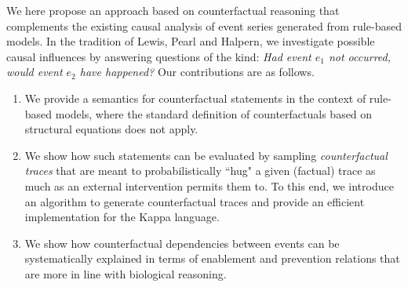 We here propose an approach based on counterfactual reasoning that
complements the existing causal analysis of event series generated
from rule-based models. In the tradition of Lewis, Pearl and Halpern,
we investigate possible causal influences by answering questions of
the kind: \textit{Had event $e_1$ not occurred, would event $e_2$ have
  happened?}
Our contributions are as follows.
\begin{enumerate}[leftmargin=0.6cm]
\item We provide a semantics for counterfactual statements in the context of
rule-based models, where the standard definition of counterfactuals based on
structural equations \cite{pearl2009causality,halpern2016actual} does not apply.
\item We show how such statements can be evaluated by sampling
\emph{counterfactual traces} that are meant to probabilistically ``hug" a given
(factual) trace as much as an external intervention permits them to. To this
end, we introduce an algorithm to generate counterfactual traces and provide an
efficient implementation for the Kappa language.
\item We show how counterfactual dependencies between events can be
systematically explained in terms of enablement and prevention relations that
are more in line with biological reasoning.
\end{enumerate}
